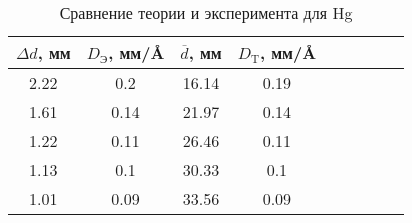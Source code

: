 \begin{table}[h!]
		\begin{center}
			\begin{tabular}{|c|c|c|c|c|c|c|c|c|}
				\hline
				$ \Delta d $, мм & $ D_{\text{Э}} $, мм/\AA & 	$ \overline{d} $, мм & $ D_{\text{T}} $, мм/\AA     \\
				\hline
         2.22 & 0.2 & 16.14 & 0.19 \\
			   1.61 & 0.14 & 21.97 & 0.14 \\
			   1.22 & 0.11 & 26.46 & 0.11 \\
			   1.13 & 0.1 & 30.33 & 0.1 \\
			   1.01 & 0.09 & 33.56 & 0.09 \\
				\hline
			\end{tabular}
		\end{center}
		\caption{Сравнение теории и эксперимента для Hg}
		\label{}
	\end{table}